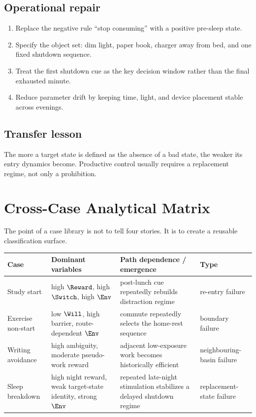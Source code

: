 \subsection*{Operational repair}
\begin{enumerate}[nosep]
  \item Replace the negative rule ``stop consuming'' with a positive pre-sleep
        state.
  \item Specify the object set: dim light, paper book, charger away from bed,
        and one fixed shutdown sequence.
  \item Treat the first shutdown cue as the key decision window rather than the
        final exhausted minute.
  \item Reduce parameter drift by keeping time, light, and device placement
        stable across evenings.
\end{enumerate}

\subsection*{Transfer lesson}
The more a target state is defined as the absence of a bad state, the weaker
its entry dynamics become. Productive control usually requires a replacement
regime, not only a prohibition.

\section{Cross-Case Analytical Matrix}

The point of a case library is not to tell four stories. It is to create a
reusable classification surface.

\begin{center}
\begin{tabularx}{\textwidth}{@{}l l X X@{}}
\toprule
Case & Dominant variables & Path dependence / emergence & Type \\
\midrule
Study start &
high $\Reward$, high $\Switch$, high $\Env$ &
post-lunch cue repeatedly rebuilds distraction regime &
re-entry failure \\

Exercise non-start &
low $\Will$, high barrier, route-dependent $\Env$ &
commute repeatedly selects the home-rest sequence &
boundary failure \\

Writing avoidance &
high ambiguity, moderate pseudo-work reward &
adjacent low-exposure work becomes historically efficient &
neighbouring-basin failure \\

Sleep breakdown &
high night reward, weak target-state identity, strong $\Env$ &
repeated late-night stimulation stabilizes a delayed shutdown regime &
replacement-state failure \\
\bottomrule
\end{tabularx}
\end{center}

